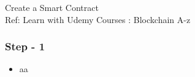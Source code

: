 \begin{frame}[fragile]\frametitle{}
\begin{center}
{\Large Create a Smart Contract}\\
{\small Ref: Learn with Udemy Courses : Blockchain A-z}
\end{center}
\end{frame}

\begin{frame}[fragile]\frametitle{Step - 1}
\begin{itemize}
\item aa
\end{itemize}
\end{frame}
